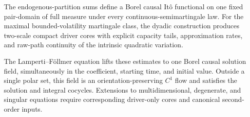 \documentclass[11pt,reqno]{amsart}
\theoremstyle{plain}
\theoremstyle{definition}
\begin{document}
The endogenous-partition sums define a Borel causal It\^o functional on one
fixed pair-domain of full measure under every continuous-semimartingale law.
For the maximal bounded-volatility martingale class, the dyadic construction
produces two-scale compact driver cores with explicit capacity tails,
approximation rates, and raw-path continuity of the intrinsic quadratic
variation.

The Lamperti--F\"ollmer equation lifts these estimates to one Borel causal
solution field, simultaneously in the coefficient, starting time, and initial
value.  Outside a single polar set, this field is an orientation-preserving
\(C^1\) flow and satisfies the solution and integral cocycles.  Extensions to
multidimensional, degenerate, and singular equations require corresponding
driver-only cores and canonical second-order inputs.
\end{document}
